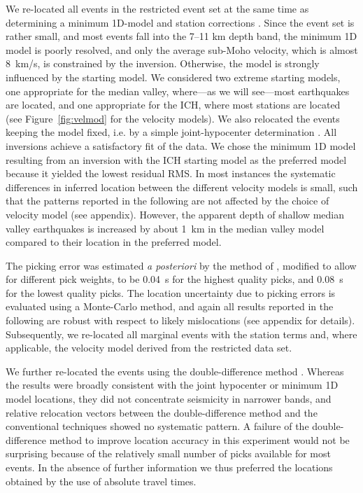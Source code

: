 \documentclass[jgr]{agu2001}
\newlength{\tw}
\begin{document}
\begin{article}
We re-located all events in the restricted event set at the same time as determining a minimum
1D-model and station corrections \citep[using VELEST,][]{kissling94}.  Since the event set is rather small, and most events
fall into the 7--11 km depth band, the 
minimum 1D model is poorly resolved, and only the average sub-Moho
velocity, which is almost 8~km/s,
is constrained by the inversion.
 Otherwise, the model is strongly influenced by the starting 
model.  We considered two extreme starting models, one appropriate for
the median valley, where---as we will see---most earthquakes are located, and
one appropriate for the ICH, where most stations are located (see
Figure~\ref{fig:velmod} for the velocity models). We also
relocated the events keeping the model fixed, i.e. by a simple
joint-hypocenter determination .  All inversions achieve a satisfactory fit of
the data. We chose the minimum 1D model resulting from an inversion with the
ICH starting model as the preferred model because it yielded the
lowest residual RMS.  In most instances the systematic differences in
inferred location between the different velocity models is small, such
that the patterns reported in the following are not affected by the
choice of velocity model (see appendix).
However, the apparent depth of shallow median valley earthquakes is
increased by about 1~km in the median valley model compared to their
location in the preferred model.  

The picking error was estimated {\it a posteriori} by the method of
\citet{wilcock91}, modified to allow for different pick weights, to be 0.04~s
for the highest quality picks, and 0.08~s for the lowest quality picks.
The location uncertainty due to
picking errors is evaluated using a Monte-Carlo method, and again all
results reported in the following are robust with respect to likely
mislocations (see appendix for details).  
Subsequently, we re-located all marginal events with the station
terms and, where applicable, the velocity model derived from the
restricted data set. 

We further re-located the events using the
double-difference method \citep{waldhauser00}.  Whereas the results
were broadly consistent with the joint hypocenter or minimum 1D model
locations, they did not concentrate seismicity in narrower bands, and
relative relocation vectors between the double-difference method and
the conventional techniques showed no systematic pattern.  A failure
of the double-difference method to improve location accuracy in this
experiment would not be surprising
because of the relatively small number of picks available for most
events. In the absence of further information we thus preferred the
locations obtained by the use of absolute travel times.


\end{article}
\end{document}
